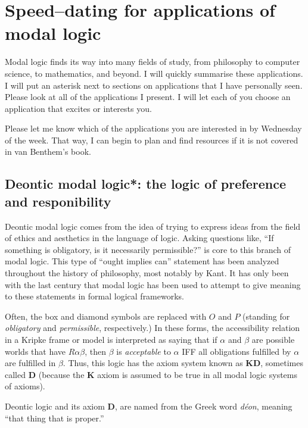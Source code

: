 \chapter[A taste of some applications of modal logic]{Speed--dating for applications of modal logic}

Modal logic finds its way into many fields of study, from philosophy to computer science, to mathematics,
and beyond. I will quickly summarise these applications. I will put an asterisk next
to sections on applications that I have personally seen. Please look at all of the
applications I present. I will let each of you choose an application that excites or
interests you.

Please let me know which of the applications you are interested in by Wednesday of the
week. That way, I can begin to plan and find resources if it is not covered in van
Benthem's book.

\setcounter{section}{-1}

\section{Deontic modal logic*: the logic of preference and responibility}
Deontic modal logic comes from the idea of trying to express ideas from the field of ethics and aesthetics
in the language of logic. Asking questions like, ``If something is obligatory, is it necessarily permissible?''
is core to this branch of modal logic. This type of ``ought implies can'' statement has been analyzed
throughout the history of philosophy, most notably by Kant. It has only been with the last century that modal 
logic has been used to attempt to give meaning to these statements in formal logical frameworks.

Often, the box and diamond symbols are replaced with $O$ and $P$ (standing for \emph{obligatory} and
\emph{permissible}, respectively.) In these forms, the accessibility relation in a Kripke frame 
or model is interpreted as saying that if $\alpha$ and $\beta$ are possible worlds that have $R \alpha \beta$,
then $\beta$ is \emph{acceptable} to $\alpha$ IFF all obligations fulfilled by $\alpha$ are fulfilled
in $\beta$. Thus, this logic has the axiom system known as \textbf{KD}, sometimes called \textbf{D} 
(because the \textbf{K} axiom is assumed to be true in all modal logic systems of axioms).

Deontic logic and its axiom \textbf{D}, are named from the Greek word \emph{d\'eon}, meaning ``that thing
that is proper.''


